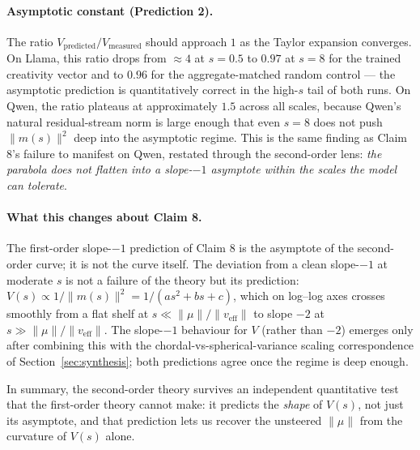 \paragraph{Asymptotic constant (Prediction 2).}
The ratio $V_{\mathrm{predicted}} / V_{\mathrm{measured}}$ should approach
$1$ as the Taylor expansion converges. On Llama, this ratio drops from
$\approx 4$ at $s = 0.5$ to $0.97$ at $s = 8$ for the trained creativity
vector and to $0.96$ for the aggregate-matched random control --- the
asymptotic prediction is quantitatively correct in the high-$s$ tail of
both runs. On Qwen, the ratio plateaus at approximately $1.5$ across all
scales, because Qwen's natural residual-stream norm is large enough that
even $s = 8$ does not push $\|m(s)\|^2$ deep into the asymptotic regime.
This is the same finding as Claim 8's failure to manifest on Qwen, restated
through the second-order lens: \emph{the parabola does not flatten into a
slope-$-1$ asymptote within the scales the model can tolerate}.

\paragraph{What this changes about Claim 8.}
The first-order slope-$-1$ prediction of Claim 8 is the asymptote of the
second-order curve; it is not the curve itself. The deviation from a clean
slope-$-1$ at moderate $s$ is not a failure of the theory but its prediction:
$V(s) \propto 1/\|m(s)\|^2 = 1/(a s^2 + b s + c)$, which on log--log axes
crosses smoothly from a flat shelf at $s \ll \|\mu\|/\|v_{\mathrm{eff}}\|$
to slope $-2$ at $s \gg \|\mu\|/\|v_{\mathrm{eff}}\|$. The slope-$-1$
behaviour for $V$ (rather than $-2$) emerges only after combining this with
the chordal-vs-spherical-variance scaling correspondence of
Section~\ref{sec:synthesis}; both predictions agree once the regime is deep
enough.

In summary, the second-order theory survives an independent quantitative
test that the first-order theory cannot make: it predicts the
\emph{shape} of $V(s)$, not just its asymptote, and that prediction lets
us recover the unsteered $\|\mu\|$ from the curvature of $V(s)$ alone.

